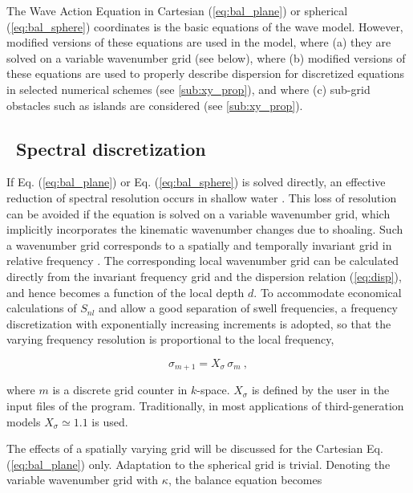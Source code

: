 The Wave Action Equation in Cartesian  (\ref{eq:bal_plane}) or spherical  (\ref{eq:bal_sphere}) coordinates is the basic
equations of the wave model. However, modified versions of these equations are
used in the model, where (a) they are solved on a variable wavenumber grid
(see below), where (b) modified versions of these equations are used to
properly describe dispersion for discretized equations in selected numerical
schemes (see \para\ref{sub:xy_prop}), and where (c) sub-grid obstacles such as
islands are considered (see \para\ref{sub:xy_prop}).


\vssub
\subsection{~Spectral discretization} \label{sec:basic_num}
\vsssub


If Eq. (\ref{eq:bal_plane}) or Eq. (\ref{eq:bal_sphere}) is solved directly, an
effective reduction of spectral resolution occurs in shallow water
\citep[see][]{tol:GAOS98b}. This loss of resolution can be avoided if the
equation is solved on a variable wavenumber grid, which implicitly
incorporates the kinematic wavenumber changes due to shoaling. Such a
wavenumber grid corresponds to a spatially and temporally invariant
grid in relative frequency \citep{tol:GAOS98b}. The corresponding local wavenumber grid can be
calculated directly from the invariant frequency grid and the dispersion
relation (\ref{eq:disp}), and hence becomes a function of the local depth
$d$. To accommodate economical calculations of $S_{nl}$ and allow a good separation of swell frequencies, a frequency discretization with 
exponentially increasing increments is adopted, so that the varying frequency resolution is proportional to the local frequency, 


\begin{equation}
\sigma_{m+1} = X_\sigma \, \sigma_m \: , \label{eq:sigma_grid}
\end{equation}

\noindent
where $m$ is a discrete grid counter in $k$-space. $X_\sigma$ is defined by
the user in the input files of the program. Traditionally, in most
applications of third-generation models $X_\sigma \simeq 1.1$ is used.

The effects of a spatially varying grid will be discussed for the Cartesian
Eq. (\ref{eq:bal_plane}) only. Adaptation to the spherical grid is
trivial. Denoting the variable wavenumber grid with $\kappa$, the balance
equation becomes

